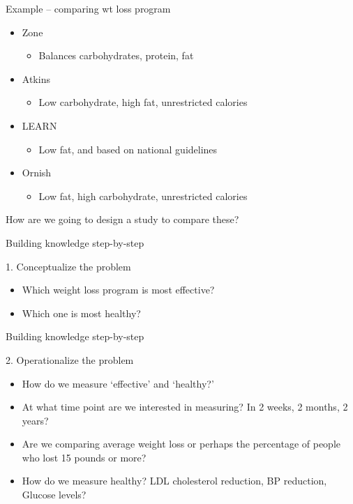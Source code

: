 \documentclass[14pt]{beamer}\usepackage[]{graphicx}\usepackage[]{color}
\begin{document}
\begin{frame}[fragile]{Example -- comparing wt loss program}

\begin{itemize}
\item Zone
  \begin{itemize}
  \item Balances carbohydrates, protein, fat
  \end{itemize}
\item Atkins
  \begin{itemize}
  \item Low carbohydrate, high fat, unrestricted calories
  \end{itemize}
\item LEARN
  \begin{itemize}
  \item Low fat, and based on national guidelines
  \end{itemize}
\item Ornish
  \begin{itemize}
  \item Low fat, high carbohydrate, unrestricted calories
  \end{itemize}
\end{itemize}

How are we going to design a study to compare these?
\end{frame}

\begin{frame}[fragile]{Building knowledge step-by-step}

1. Conceptualize the problem

\begin{itemize}
\item Which weight loss program is most effective?
\item Which one is most healthy?
\end{itemize}
\end{frame}

\begin{frame}[fragile]{Building knowledge step-by-step}

2. Operationalize the problem

\begin{itemize}
\item How do we measure `effective' and `healthy?'
\item At what time point are we interested in measuring? In 2 weeks, 2 months, 2 years?
\item Are we comparing average weight loss or perhaps the percentage of people who lost 15 pounds or more?
\item How do we measure healthy?  LDL cholesterol reduction, BP reduction, Glucose levels?
\end{itemize}
\end{frame}
\end{document}
